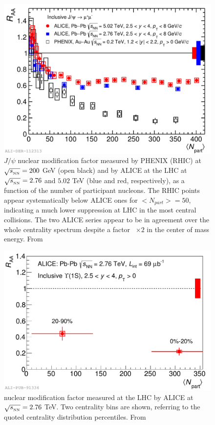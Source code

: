 \begin{figure}[!t]
\begin{center}
\includegraphics[width=0.8\linewidth]{Chapters/Analysis/Figs/2016-Sep-15-RAA_centr_Alice5_Alice276_Phenix.pdf}
\caption{$J/\psi$ nuclear modification factor measured by PHENIX (RHIC) at $\sqrt{s_{_{\rm NN}}}=200$ GeV (open black) and by ALICE at the LHC at $\sqrt{s_{_{\rm NN}}}=2.76$ and $5.02$ TeV (blue and red, respectively), as a function of the number of participant nucleons. The RHIC points appear systematically below ALICE ones for $<N_{part}>=50$, indicating a much lower suppression at LHC in the most central collisions. The two ALICE series appear to be in agreement over the whole centrality spectrum despite a factor ~$\times2$ in the center of mass energy. From \cite{Caffarri:2016xvd}}
\label{fig:LHC_RHIC_jpsi}
\end{center}
\end{figure}

\begin{figure}[!t]
\begin{center}
\includegraphics[width=0.8\linewidth]{Chapters/Analysis/Figs/2014-Dec-16-Raa_centr.pdf}
\caption{\upsi nuclear modification factor measured at the LHC by ALICE at $\sqrt{s_{_{\rm NN}}}=2.76$ TeV. Two centrality bins are shown, referring to the quoted centrality distribution percentiles. From \cite{Abelev:2014nua}}
\label{fig:LHC_upsi}
\end{center}
\end{figure}


